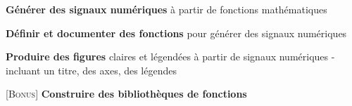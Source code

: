 \item \textbf{Générer des signaux numériques} à partir de fonctions mathématiques 
\item \textbf{Définir et documenter des fonctions} pour générer des signaux numériques
\item \textbf{Produire des figures} claires et légendées à partir de signaux numériques - incluant un titre, des axes, des légendes
\item \textsc{\scriptsize [Bonus]} \textbf{Construire des bibliothèques de fonctions}